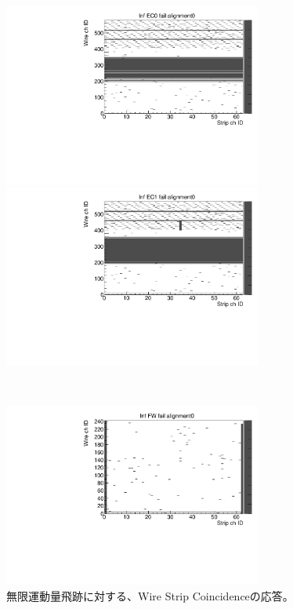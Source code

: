   \begin{figure}
      \begin{minipage}[b]{.5\linewidth}
          \centering
          \includegraphics[height=6cm]{fig/Test/B_InfEC0_WS.pdf}
      \end{minipage}
      \begin{minipage}[b]{.5\linewidth}
          \centering
          \includegraphics[height=6cm]{fig/Test/B_InfEC1_WS.pdf}
      \end{minipage}\\
      \begin{minipage}[b]{\linewidth}
          \centering
          \includegraphics[height=6cm]{fig/Test/B_InfFW_WS.pdf}
      \end{minipage}
      \caption[異なる画像形式の比較]{無限運動量飛跡に対する、Wire Strip Coincidenceの応答。}
      \label{Inf_B_WS}
  \end{figure}

